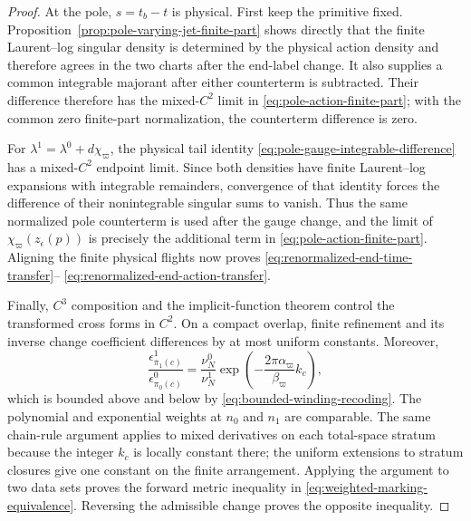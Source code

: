 \documentclass[11pt]{amsart}
\numberwithin{equation}{section}
\theoremstyle{definition}
\theoremstyle{remark}
\begin{document}
\begin{proof}
At the pole, $s=t_b-t$ is physical.  First keep the primitive fixed.
Proposition~\ref{prop:pole-varying-jet-finite-part} shows directly that the
finite Laurent--log singular density is determined by the physical action
density and therefore agrees in the two charts after the end-label change.
It also supplies a common integrable majorant after either counterterm is
subtracted.  Their difference therefore has the mixed-$C^2$ limit in
\eqref{eq:pole-action-finite-part}; with the common zero finite-part
normalization, the counterterm difference is zero.

For $\lambda^1=\lambda^0+d\chi_\varpi$, the physical tail identity
\eqref{eq:pole-gauge-integrable-difference} has a mixed-$C^2$ endpoint
limit.  Since both densities have finite Laurent--log expansions with
integrable remainders, convergence of that identity forces the difference
of their nonintegrable singular sums to vanish.  Thus the same normalized
pole counterterm is used after the gauge change, and the limit of
$\chi_\varpi(z_\epsilon(p))$ is precisely the additional term in
\eqref{eq:pole-action-finite-part}.  Aligning the finite physical flights
now proves \eqref{eq:renormalized-end-time-transfer}--
\eqref{eq:renormalized-end-action-transfer}.

Finally, $C^3$ composition and the implicit-function theorem control the
transformed cross forms in $C^2$.  On a compact overlap, finite refinement
and its inverse change coefficient differences by at most uniform
constants.  Moreover,
\begin{equation}\label{eq:seam-scale-change-marking}
 \frac{\epsilon^1_{\pi_1(c)}}{\epsilon^0_{\pi_0(c)}}
 =\frac{\nu_N^0}{\nu_N^1}
   \exp\!\left(-\frac{2\pi\alpha_\varpi}{\beta_\varpi}k_c\right),
\end{equation}
which is bounded above and below by
\eqref{eq:bounded-winding-recoding}.  The polynomial and exponential
weights at $n_0$ and $n_1$ are comparable.  The same chain-rule argument
applies to mixed derivatives on each total-space stratum because the
integer $k_c$ is locally constant there; the uniform extensions to stratum
closures give one constant on the finite arrangement.  Applying the
argument to two data sets proves the forward metric inequality in
\eqref{eq:weighted-marking-equivalence}.  Reversing the admissible change
proves the opposite inequality.
\end{proof}
\end{document}
